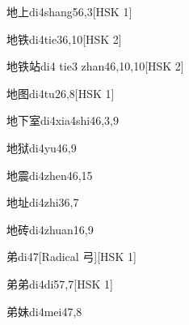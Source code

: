 \begin{entry}{地上}{di4shang5}{6,3}[HSK 1]
\end{entry}

\begin{entry}{地铁}{di4tie3}{6,10}[HSK 2]
\end{entry}

\begin{entry}{地铁站}{di4 tie3 zhan4}{6,10,10}[HSK 2]
\end{entry}

\begin{entry}{地图}{di4tu2}{6,8}[HSK 1]
\end{entry}

\begin{entry}{地下室}{di4xia4shi4}{6,3,9}
\end{entry}

\begin{entry}{地狱}{di4yu4}{6,9}
\end{entry}

\begin{entry}{地震}{di4zhen4}{6,15}
\end{entry}

\begin{entry}{地址}{di4zhi3}{6,7}
\end{entry}

\begin{entry}{地砖}{di4zhuan1}{6,9}
\end{entry}

\begin{entry}{弟}{di4}{7}[Radical 弓][HSK 1]
\end{entry}

\begin{entry}{弟弟}{di4di5}{7,7}[HSK 1]
\end{entry}

\begin{entry}{弟妹}{di4mei4}{7,8}
\end{entry}

